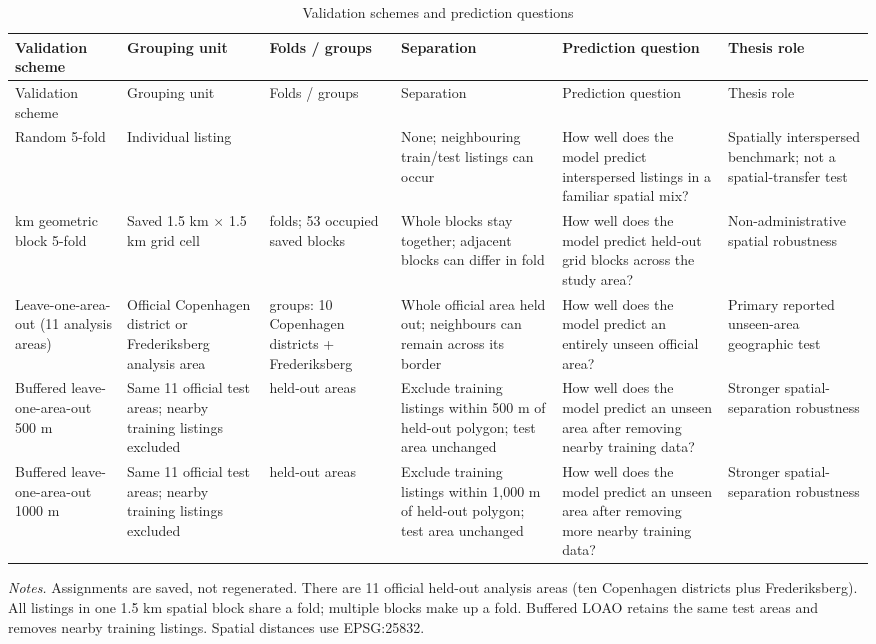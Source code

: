 \begin{landscape}
\small
\begin{longtable}{>{\raggedright\arraybackslash}p{3.3cm}>{\raggedright\arraybackslash}p{3.4cm}>{\raggedright\arraybackslash}p{2.9cm}>{\raggedright\arraybackslash}p{4.3cm}>{\raggedright\arraybackslash}p{4.7cm}>{\raggedright\arraybackslash}p{4.3cm}}
\caption{Validation schemes and prediction questions}\label{tab:validation-designs}\\
\toprule
Validation scheme & Grouping unit & Folds / groups & Separation & Prediction question & Thesis role \\
\midrule
\endfirsthead
\toprule
Validation scheme & Grouping unit & Folds / groups & Separation & Prediction question & Thesis role \\
\midrule
\endhead
Random 5-fold & Individual listing & 5 & None; neighbouring train/test listings can occur & How well does the model predict interspersed listings in a familiar spatial mix? & Spatially interspersed benchmark; not a spatial-transfer test \\
1.5 km geometric block 5-fold & Saved 1.5 km $\times$ 1.5 km grid cell & 5 folds; 53 occupied saved blocks & Whole blocks stay together; adjacent blocks can differ in fold & How well does the model predict held-out grid blocks across the study area? & Non-administrative spatial robustness \\
Leave-one-area-out (11 analysis areas) & Official Copenhagen district or Frederiksberg analysis area & 11 groups: 10 Copenhagen districts + Frederiksberg & Whole official area held out; neighbours can remain across its border & How well does the model predict an entirely unseen official area? & Primary reported unseen-area geographic test \\
Buffered leave-one-area-out 500 m & Same 11 official test areas; nearby training listings excluded & 11 held-out areas & Exclude training listings within 500 m of held-out polygon; test area unchanged & How well does the model predict an unseen area after removing nearby training data? & Stronger spatial-separation robustness \\
Buffered leave-one-area-out 1000 m & Same 11 official test areas; nearby training listings excluded & 11 held-out areas & Exclude training listings within 1,000 m of held-out polygon; test area unchanged & How well does the model predict an unseen area after removing more nearby training data? & Stronger spatial-separation robustness \\
\bottomrule
\end{longtable}
{\footnotesize\noindent\emph{Notes.} Assignments are saved, not regenerated. There are 11 official held-out analysis areas (ten Copenhagen districts plus Frederiksberg). All listings in one 1.5 km spatial block share a fold; multiple blocks make up a fold. Buffered LOAO retains the same test areas and removes nearby training listings. Spatial distances use EPSG:25832.\par}
\end{landscape}
